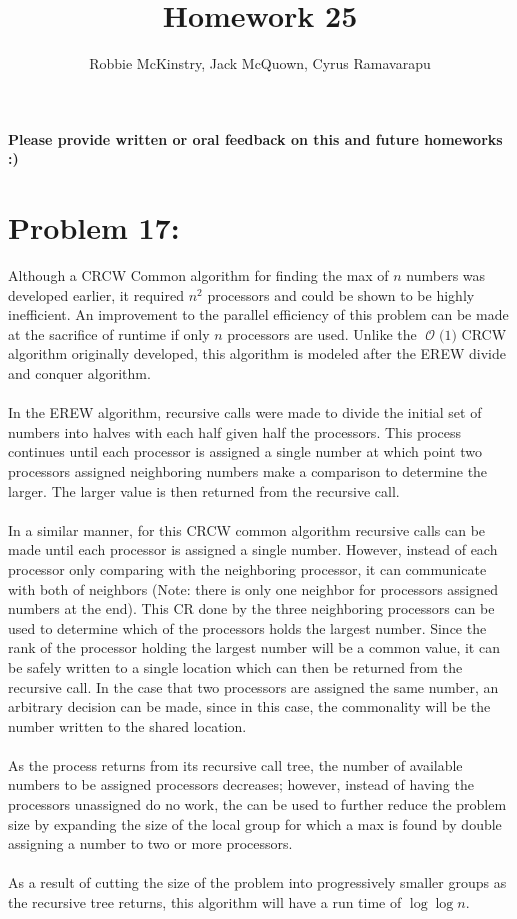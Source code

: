 \documentclass[12pt]{article}
\newcommand{\BigO}[1]{\ensuremath{\operatorname{\mathcal{O}}\bigl(#1\bigr)}}
\begin{document}
\title{Homework 25}
\author{Robbie McKinstry, Jack McQuown, Cyrus Ramavarapu}
\renewcommand{\today}{31 October 2016}
\renewcommand{\baselinestretch}{1.5}
\maketitle

\textbf{Please provide written or oral feedback on this and future homeworks :)}

\section*{Problem 17: }
Although a CRCW Common algorithm for finding the max of $n$ numbers
was developed earlier, it required $n^2$ processors and could be shown
to be highly inefficient.  An improvement to the parallel efficiency of
this problem can be made at the sacrifice of runtime if only $n$ 
processors are used.  Unlike the \BigO{1} CRCW algorithm originally
developed, this algorithm is modeled after the EREW divide and
conquer algorithm.\\\\
In the EREW algorithm, recursive calls were made to divide the 
initial set of numbers into halves with each half given half
the processors.  This process continues until each processor
is assigned a single number at which point two processors
assigned neighboring numbers make a comparison to determine the
larger.  The larger value is then returned from the recursive
call.\\\\
In a similar manner, for this CRCW common algorithm recursive
calls can be made until each processor is assigned a single 
number.  However, instead of each processor only comparing
with the neighboring processor, it can communicate with both
of neighbors (Note: there is only one neighbor for processors
assigned numbers at the end).  This CR done by the three 
neighboring processors can be used to determine which of 
the processors holds the largest number.  Since the rank
of the processor holding the largest number will be
a common value, it can be safely written to a single location
which can then be returned from the recursive call.  In the
case that two processors are assigned the same number,
an arbitrary decision can be made, since in this case,
the commonality will be the number written to the shared
location.\\\\
As the process returns from its recursive call tree, the number of
available numbers to be assigned processors decreases; however,
instead of having the processors unassigned do no work, the can be
used to further reduce the problem size by expanding the size
of the local group for which a max is found by double assigning
a number to two or more processors.\\\\ 
As a result of cutting the size of the problem into progressively
smaller groups as the recursive tree returns, this algorithm
will have a run time of $\log \log n$.
\end{document}
